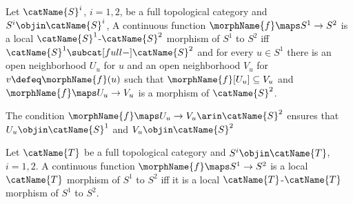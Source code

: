 \documentclass{article}
\begin{document}
\begin{definition}
\label{def:topLocal}
Let $\catName{S}^i$, $i=1,2$, be a full topological category and
$S^i \objin \catName{S}^i$, A continuous function
$\morphName{f} \maps S^1 \to S^2$ is a local
$\catName{S}^1$-$\catName{S}^2$ morphism of $S^1$ to $S^2$ iff
$\catName{S}^1 \subcat[full-] \catName{S}^2$ and for every
$u \in S^1$ there is an open neighborhood $U_u$ for $u$ and an open
neighborhood $V_u$ for $v \defeq \morphName{f}(u)$ such that
$\morphName{f}[U_u] \subseteq V_u$ and $\morphName{f} \maps U_u \to V_u$
is a morphism of $\catName{S}^2$.

\begin{remark}
The condition $\morphName{f} \maps U_u \to V_u \arin \catName{S}^2$
ensures that $U_u \objin \catName{S}^1$ and $V_u \objin \catName{S}^2$
\end{remark}

Let $\catName{T}$ be a full topological category and
$S^i \objin \catName{T}$, $i=1,2$. A continuous function
$\morphName{f} \maps S^1 \to S^2$ is a local $\catName{T}$ morphism of
$S^1$ to $S^2$ iff it is a local $\catName{T}$-$\catName{T}$ morphism
of $S^1$ to $S^2$.
\end{definition}
\end{document}
